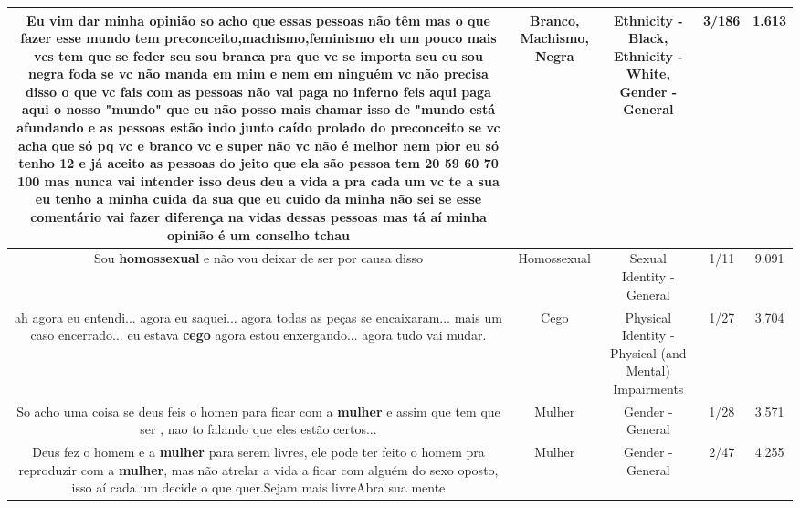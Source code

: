\documentclass[11pt]{article}
\newlength\mylength
\begin{document}
\begin{center}
\begin{longtable}{|C{.65\mylength}|C{.30\mylength}|C{.12\mylength}|C{.12\mylength}|C{.12\mylength}|}
  \small Eu vim dar minha opinião so acho que essas pessoas não têm mas o que fazer esse mundo tem preconceito,\textbf{machismo},feminismo eh um pouco mais vcs tem que se feder seu sou branca pra que vc se importa seu eu sou \textbf{negra} foda se vc não manda em mim e nem em ninguém vc não precisa disso o que vc fais com as pessoas não vai paga no inferno feis aqui paga aqui o nosso "mundo" que eu não posso mais chamar isso de "mundo está afundando e as pessoas estão indo junto caído prolado do preconceito se vc acha que só pq vc e \textbf{branco} vc e super não vc não é melhor nem pior eu só tenho 12 e já aceito as pessoas do jeito que ela são pessoa tem 20 59 60 70 100 mas nunca vai intender isso deus deu a vida a pra cada um vc te a sua eu tenho a minha cuida da sua que eu cuido da minha não sei se esse comentário vai fazer diferença na vidas dessas pessoas mas tá aí minha opinião é um conselho tchau\normalsize   & Branco, Machismo, Negra & Ethnicity - Black, Ethnicity - White, Gender - General & 3/186 & 1.613 \\  \hline
  \small Sou \textbf{homossexual} e não vou deixar de ser por causa disso\normalsize   & Homossexual & Sexual Identity - General & 1/11 & 9.091 \\  \hline
  \small ah agora eu entendi... agora eu saquei... agora todas as peças se encaixaram... mais um caso encerrado... eu estava \textbf{cego} agora estou enxergando... agora tudo vai mudar.\normalsize   & Cego & Physical Identity - Physical (and Mental) Impairments & 1/27 & 3.704 \\  \hline
  \small So acho uma coisa se deus feis o homen para ficar com a \textbf{mulher} e assim que tem que ser , nao to falando que eles estão certos...\normalsize   & Mulher & Gender - General & 1/28 & 3.571 \\  \hline
  \small Deus fez o homem e a \textbf{mulher} para serem livres, ele pode ter feito o homem pra reproduzir com a \textbf{mulher}, mas não atrelar a vida a ficar com alguém do sexo oposto, isso aí cada um decide o que quer.Sejam mais livreAbra sua mente\normalsize   & Mulher & Gender - General & 2/47 & 4.255 \\  \hline

\end{longtable}
\end{center}
\end{document}
